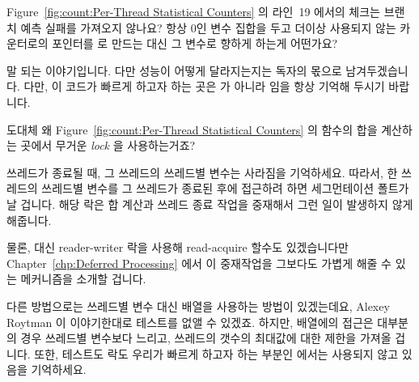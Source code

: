 \begin{enumerate}
\QuickQ{}
	Figure~\ref{fig:count:Per-Thread Statistical Counters} 의 라인~19
	에서의  체크는 브랜치 예측 실패를 가져오지 않나요?
	항상 0인 변수 집합을 두고 더이상 사용되지 않는 카운터로의 포인터를
	 로 만드는 대신 그 변수로 향하게 하는게 어떤가요?

\QuickA{}
	말 되는 이야기입니다.
	다만 성능이 어떻게 달라지는지는 독자의 몫으로 남겨두겠습니다.
	다만, 이 코드가 빠르게 하고자 하는 곳은  가 아니라
	 임을 항상 기억해 두시기 바랍니다.

\QuickQ{}
	도대체 왜 Figure~\ref{fig:count:Per-Thread Statistical Counters} 의
	 함수의 합을 계산하는 곳에서 무거운 \emph{lock} 을
	사용하는거죠?

\QuickA{}
	쓰레드가 종료될 때, 그 쓰레드의 쓰레드별 변수는 사라짐을 기억하세요.
	따라서, 한 쓰레드의 쓰레드별 변수를 그 쓰레드가 종료된 후에 접근하려
	하면 세그먼테이션 폴트가 날 겁니다.
	해당 락은 합 계산과 쓰레드 종료 작업을 중재해서 그런 일이 발생하지 않게
	해줍니다.

	물론, 대신 reader-writer 락을 사용해 read-acquire 할수도
	있겠습니다만 Chapter~\ref{chp:Deferred Processing} 에서 이 중재작업을
	그보다도 가볍게 해줄 수 있는 메커니즘을 소개할 겁니다.

	다른 방법으로는 쓰레드별 변수 대신 배열을 사용하는 방법이 있겠는데요,
	Alexey Roytman 이 이야기한대로  테스트를 없앨 수 있겠죠.
	하지만, 배열에의 접근은 대부분의 경우 쓰레드별 변수보다 느리고,
	쓰레드의 갯수의 최대값에 대한 제한을 가져올 겁니다.
	또한, 테스트도 락도 우리가 빠르게 하고자 하는 부분인 
	에서는 사용되지 않고 있음을 기억하세요.
	\iffalse


\end{enumerate}
